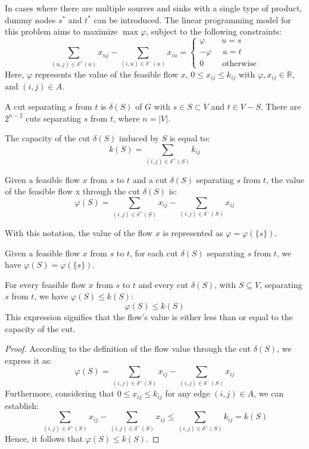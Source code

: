 In cases where there are multiple sources and sinks with a single type of product, dummy nodes $s^{\ast}$ and $t^{\ast}$ can be introduced. 
The linear programming model for this problem aims to maximize $\max \varphi$, subject to the following constraints:
\[\sum_{(u,j)\in \delta^{+}(u)}x_{uj}-\sum_{(i,u)\in \delta^{-}(u)}x_{iu}=
\begin{cases}
    \varphi \:\:\:\:\:\:\:\:\: u=s    \\
    -\varphi \:\:\:\:\:\: u=t   \\
    0 \:\:\:\:\:\:\:\:\:\: \text{otherwise}
\end{cases}\]
Here, $\varphi$ represents the value of the feasible flow $x$, $0 \leq x_{ij} \leq k_{ij}$ with $\varphi,x_{ij} \in \mathbb{R}$, and $(i,j) \in A$.
\begin{definition}
    A cut separating $s$ from $t$ is $\delta(S)$ of $G$ with $s \in S \subset V$ and $t \in V-S$. There are $2^{n-2}$ cuts separating $s$ from $t$, where 
    $n=\left\lvert V \right\rvert$.
\end{definition}
\begin{definition}
    The capacity of the cut $\delta(S)$ induced by $S$ is equal to: 
    \[k(S)=\sum_{(i,j)\in \delta^{+}(S)}k_{ij}\]
\end{definition}
\begin{definition}
    Given a feasible flow $x$ from $s$ to $t$ and a cut $\delta(S)$ separating $s$ from $t$, the value of the feasible flow x through the cut $\delta(S)$ is: 
    \[\varphi(S)=\sum_{(i,j)\in \delta^{+}(S)}x_{ij} - \sum_{(i,j)\in \delta^{-}(S)}x_{ij}\]
\end{definition}
With this notation, the value of the flow $x$ is represented as $\varphi = \varphi(\{s\})$. 
\begin{property}
    Given a feasible flow $x$ from $s$ to $t$, for each cut $\delta(S)$ separating $s$ from $t$, we have $\varphi(S)=\varphi(\{s\})$.
\end{property}
\begin{property}
    For every feasible flow $x$ from $s$ to $t$ and every cut $\delta(S)$, with $S \subseteq V$, separating $s$ from $t$, we have $\varphi(S) \leq k(S)$:
    \[\varphi(S) \leq k(S)\]
    This expression signifies that the flow's value is either less than or equal to the capacity of the cut.
\end{property}
\begin{proof}
    According to the definition of the flow value through the cut $\delta(S)$, we express it as:
    \[\varphi(S)=\sum_{(i,j) \in \delta^{+}(S)}x_{ij}-\sum_{(i,j) \in \delta^{-}(S)}x_{ij}\]
    Furthermore, considering that $0 \leq x_{ij } \leq k_{ij}$ for any edge $(i, j) \in A$, we can establish:
    \[\sum_{(i,j) \in \delta^{+}(S)}x_{ij}-\sum_{(i,j) \in \delta^{-}(S)}x_{ij} \leq \sum_{(i,j) \in \delta^{+}(S)}k_{ij}=k(S)\]
    Hence, it follows that $\varphi(S) \leq k(S)$.
\end{proof}

